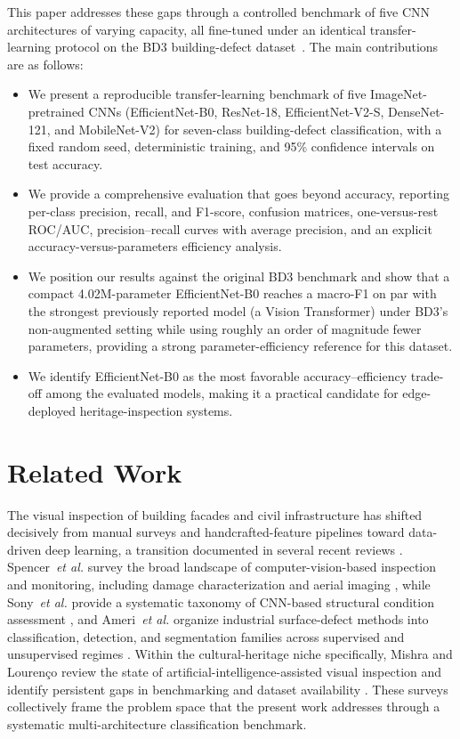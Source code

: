 \documentclass[ASNA, twocolumn]{USG}
\begin{document}
This paper addresses these gaps through a controlled benchmark of five CNN architectures of varying capacity, all fine-tuned under an identical transfer-learning protocol on the BD3 building-defect dataset~\cite{ref40}. The main contributions are as follows:
\begin{itemize}
\item We present a reproducible transfer-learning benchmark of five ImageNet-pretrained CNNs (EfficientNet-B0, ResNet-18, EfficientNet-V2-S, DenseNet-121, and MobileNet-V2) for seven-class building-defect classification, with a fixed random seed, deterministic training, and 95\% confidence intervals on test accuracy.
\item We provide a comprehensive evaluation that goes beyond accuracy, reporting per-class precision, recall, and F1-score, confusion matrices, one-versus-rest ROC/AUC, precision--recall curves with average precision, and an explicit accuracy-versus-parameters efficiency analysis.
\item We position our results against the original BD3 benchmark and show that a compact 4.02M-parameter EfficientNet-B0 reaches a macro-F1 on par with the strongest previously reported model (a Vision Transformer) under BD3's non-augmented setting while using roughly an order of magnitude fewer parameters, providing a strong parameter-efficiency reference for this dataset.
\item We identify EfficientNet-B0 as the most favorable accuracy--efficiency trade-off among the evaluated models, making it a practical candidate for edge-deployed heritage-inspection systems.
\end{itemize}

\section{Related Work}

The visual inspection of building facades and civil infrastructure has shifted decisively from manual surveys and handcrafted-feature pipelines toward data-driven deep learning, a transition documented in several recent reviews \cite{ref1,ref2,ref3,ref4}. Spencer~\textit{et al.} survey the broad landscape of computer-vision-based inspection and monitoring, including damage characterization and aerial imaging \cite{ref2}, while Sony~\textit{et al.} provide a systematic taxonomy of CNN-based structural condition assessment \cite{ref3}, and Ameri~\textit{et al.} organize industrial surface-defect methods into classification, detection, and segmentation families across supervised and unsupervised regimes \cite{ref4}. Within the cultural-heritage niche specifically, Mishra and Lourenço review the state of artificial-intelligence-assisted visual inspection and identify persistent gaps in benchmarking and dataset availability \cite{ref1}. These surveys collectively frame the problem space that the present work addresses through a systematic multi-architecture classification benchmark.
\end{document}
